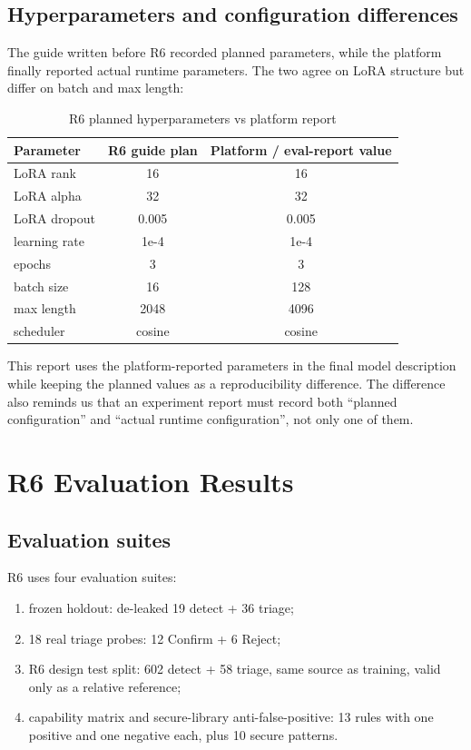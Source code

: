 \documentclass[11pt]{article}
\begin{document}
\subsection{Hyperparameters and configuration differences}

The guide written before R6 recorded planned parameters, while the platform finally reported actual runtime
parameters. The two agree on LoRA structure but differ on batch and max length:

\begin{table}[h]
\centering
\caption{R6 planned hyperparameters vs platform report}
\label{tab:r6-hparams-en}
\small
\begin{tabular}{lcc}
\toprule
\textbf{Parameter} & \textbf{R6 guide plan} & \textbf{Platform / eval-report value} \\
\midrule
LoRA rank & 16 & 16 \\
LoRA alpha & 32 & 32 \\
LoRA dropout & 0.005 & 0.005 \\
learning rate & 1e-4 & 1e-4 \\
epochs & 3 & 3 \\
batch size & 16 & 128 \\
max length & 2048 & 4096 \\
scheduler & cosine & cosine \\
\bottomrule
\end{tabular}
\end{table}

This report uses the platform-reported parameters in the final model description while keeping the planned
values as a reproducibility difference. The difference also reminds us that an experiment report must record
both ``planned configuration'' and ``actual runtime configuration'', not only one of them.

\section{R6 Evaluation Results}

\subsection{Evaluation suites}

R6 uses four evaluation suites:

\begin{enumerate}
  \item frozen holdout: de-leaked 19 detect + 36 triage;
  \item 18 real triage probes: 12 Confirm + 6 Reject;
  \item R6 design test split: 602 detect + 58 triage, same source as training, valid only as a relative
        reference;
  \item capability matrix and secure-library anti-false-positive: 13 rules with one positive and one
        negative each, plus 10 secure patterns.
\end{enumerate}
\end{document}
